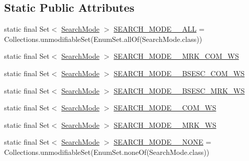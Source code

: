 \subsection*{Static Public Attributes}
\begin{DoxyCompactItemize}
\item 
static final Set$<$ \mbox{\hyperlink{enumcom_1_1mysql_1_1cj_1_1util_1_1_string_utils_1_1_search_mode}{Search\+Mode}} $>$ \mbox{\hyperlink{classcom_1_1mysql_1_1cj_1_1util_1_1_string_utils_a58f73e83944e15181d667036572ebfed}{S\+E\+A\+R\+C\+H\+\_\+\+M\+O\+D\+E\+\_\+\+\_\+\+A\+LL}} = Collections.\+unmodifiable\+Set(Enum\+Set.\+all\+Of(Search\+Mode.\+class))
\item 
static final Set$<$ \mbox{\hyperlink{enumcom_1_1mysql_1_1cj_1_1util_1_1_string_utils_1_1_search_mode}{Search\+Mode}} $>$ \mbox{\hyperlink{classcom_1_1mysql_1_1cj_1_1util_1_1_string_utils_a4939859d95188a332dde5db0a4189663}{S\+E\+A\+R\+C\+H\+\_\+\+M\+O\+D\+E\+\_\+\+\_\+\+M\+R\+K\+\_\+\+C\+O\+M\+\_\+\+WS}}
\item 
static final Set$<$ \mbox{\hyperlink{enumcom_1_1mysql_1_1cj_1_1util_1_1_string_utils_1_1_search_mode}{Search\+Mode}} $>$ \mbox{\hyperlink{classcom_1_1mysql_1_1cj_1_1util_1_1_string_utils_a6e33ff6edd75cc13aa756e23efd811a1}{S\+E\+A\+R\+C\+H\+\_\+\+M\+O\+D\+E\+\_\+\+\_\+\+B\+S\+E\+S\+C\+\_\+\+C\+O\+M\+\_\+\+WS}}
\item 
static final Set$<$ \mbox{\hyperlink{enumcom_1_1mysql_1_1cj_1_1util_1_1_string_utils_1_1_search_mode}{Search\+Mode}} $>$ \mbox{\hyperlink{classcom_1_1mysql_1_1cj_1_1util_1_1_string_utils_a6a4e98dfc843d93382e078d3dbbc8103}{S\+E\+A\+R\+C\+H\+\_\+\+M\+O\+D\+E\+\_\+\+\_\+\+B\+S\+E\+S\+C\+\_\+\+M\+R\+K\+\_\+\+WS}}
\item 
static final Set$<$ \mbox{\hyperlink{enumcom_1_1mysql_1_1cj_1_1util_1_1_string_utils_1_1_search_mode}{Search\+Mode}} $>$ \mbox{\hyperlink{classcom_1_1mysql_1_1cj_1_1util_1_1_string_utils_a38602d2b01fcc1aee1f16f5fc488d946}{S\+E\+A\+R\+C\+H\+\_\+\+M\+O\+D\+E\+\_\+\+\_\+\+C\+O\+M\+\_\+\+WS}}
\item 
static final Set$<$ \mbox{\hyperlink{enumcom_1_1mysql_1_1cj_1_1util_1_1_string_utils_1_1_search_mode}{Search\+Mode}} $>$ \mbox{\hyperlink{classcom_1_1mysql_1_1cj_1_1util_1_1_string_utils_a3b7aa79cacbfd0538cb0a75014e13bb0}{S\+E\+A\+R\+C\+H\+\_\+\+M\+O\+D\+E\+\_\+\+\_\+\+M\+R\+K\+\_\+\+WS}}
\item 
static final Set$<$ \mbox{\hyperlink{enumcom_1_1mysql_1_1cj_1_1util_1_1_string_utils_1_1_search_mode}{Search\+Mode}} $>$ \mbox{\hyperlink{classcom_1_1mysql_1_1cj_1_1util_1_1_string_utils_a96bd30b71e422236854638c4d47c8c63}{S\+E\+A\+R\+C\+H\+\_\+\+M\+O\+D\+E\+\_\+\+\_\+\+N\+O\+NE}} = Collections.\+unmodifiable\+Set(Enum\+Set.\+none\+Of(Search\+Mode.\+class))
\end{DoxyCompactItemize}


